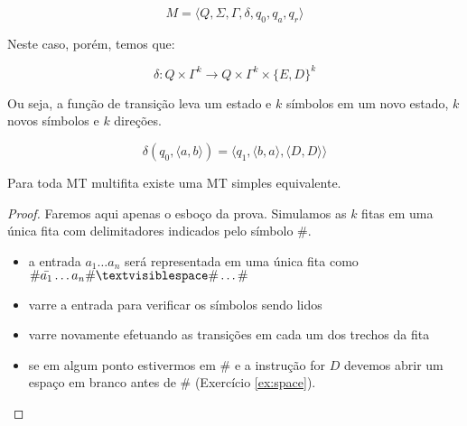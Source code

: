 \begin{displaymath}
M = \langle Q, \Sigma, \Gamma, \delta, q_0, q_a, q_r \rangle
\end{displaymath}

Neste caso, porém, temos que:

\begin{displaymath}
\delta : Q \times \Gamma^k \to Q \times \Gamma^k \times \{E, D\}^k
\end{displaymath}

Ou seja, a função de transição leva um estado e $k$ símbolos em um novo estado, $k$ novos símbolos e $k$ direções.

\begin{example}
  \begin{displaymath}
    \delta(q_0, \langle a, b \rangle) = \langle q_1, \langle b,a \rangle, \langle D, D \rangle \rangle
  \end{displaymath}
  
  \begin{center}
  \end{center}
\end{example}

\begin{theorem}
  \label{theo:multifita}
  Para toda MT multifita existe uma MT simples equivalente.
\end{theorem}
\begin{proof}
  Faremos aqui apenas o esboço da prova.
  Simulamos as $k$ fitas em uma única fita com delimitadores indicados pelo símbolo $\#$.
  \begin{itemize}
  \item a entrada $a_1 \dots a_n$ será representada em uma única fita como $\# \bar{a_1} \dots a_n \# \textvisiblespace \# \dots \#$
  \item varre a entrada para verificar os símbolos sendo lidos
  \item varre novamente efetuando as transições em cada um dos trechos da fita
  \item se em algum ponto estivermos em $\#$ e a instrução for $D$ devemos abrir um espaço em branco antes de $\#$ (Exercício \ref{ex:space}).
  \end{itemize}
\end{proof}

